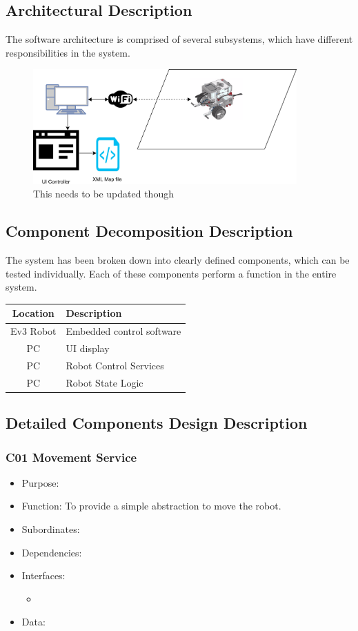 \subsection{Architectural Description}
The software architecture is comprised of several subsystems, which have different responsibilities in the system.

\begin{figure}
	\centering
	\includegraphics[width=0.9\textwidth]{Robot_system.png}	
	\caption{\label{fig:systemView}This needs to be updated though}
\end{figure}	

\subsection{Component Decomposition Description}
The system has been broken down into clearly defined components, which can be tested individually. Each of these components perform a function in the entire system.

\begin{tabular}{|c|l|}
	\hline 
	\bf{Location} & \bf{Description} \\ 
	\hline 
	\hline 
	Ev3 Robot & Embedded control software \\ 
	\hline 
	PC & UI display \\ 
	\hline 
	PC & Robot Control Services \\ 
	\hline 
	PC & Robot State Logic \\ 
	\hline 
\end{tabular} 

\subsection{Detailed Components Design Description}
\subsubsection{C01 Movement Service}
\begin{itemize}
	\item Purpose: 
	\item Function: To provide a simple abstraction to move the robot.
	\item Subordinates: 
	\item Dependencies: 
	\item Interfaces: 
	\begin{itemize}
		\item 
	\end{itemize}
	\item Data: 
\end{itemize}

